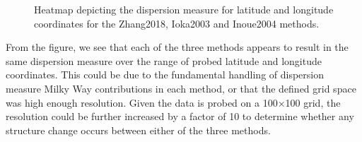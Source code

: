 \documentclass{article}
\begin{document}
\begin{figure}[!htb]
\centering
{}\hfill
{}\par 
{}
\caption{Heatmap depicting the dispersion measure for latitude and longitude coordinates for the Zhang2018, Ioka2003 and Inoue2004 methods.}
\label{fig:heatmapDM}
\end{figure}

From the figure, we see that each of the three methods appears to result in the same dispersion measure over the range of probed latitude and longitude coordinates. This could be due to the fundamental handling of dispersion measure Milky Way contributions in each method, or that the defined grid space was high enough resolution. Given the data is probed on a 100$\times$100 grid, the resolution could be further increased by a factor of 10 to determine whether any structure change occurs between either of the three methods.
\end{document}
